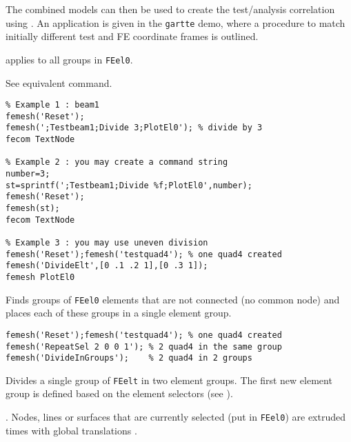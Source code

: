 The combined models can then be used to create the test/analysis correlation using \fesens. An application is given in the {\tt gartte} demo, where a procedure to match initially different test and FE coordinate frames is outlined.


  applies to all groups in {\tt FEel0}.

See equivalent  command.

\begin{verbatim}
% Example 1 : beam1
femesh('Reset');
femesh(';Testbeam1;Divide 3;PlotEl0'); % divide by 3
fecom TextNode

% Example 2 : you may create a command string
number=3;
st=sprintf(';Testbeam1;Divide %f;PlotEl0',number);
femesh('Reset');
femesh(st);
fecom TextNode

% Example 3 : you may use uneven division
femesh('Reset');femesh('testquad4'); % one quad4 created
femesh('DivideElt',[0 .1 .2 1],[0 .3 1]); 
femesh PlotEl0

\end{verbatim}%


Finds groups of {\tt FEel0} elements that are not connected (no common node) and places each of these groups in a single element group. 

\begin{verbatim}
femesh('Reset');femesh('testquad4'); % one quad4 created
femesh('RepeatSel 2 0 0 1'); % 2 quad4 in the same group
femesh('DivideInGroups');    % 2 quad4 in 2 groups
\end{verbatim}%


Divides a single group  of {\tt FEelt} in two element groups. The first new element group is defined based on the element selectors (see ).


.  Nodes, lines or surfaces that are currently selected (put in {\tt FEel0}) are extruded  times with global translations .  

